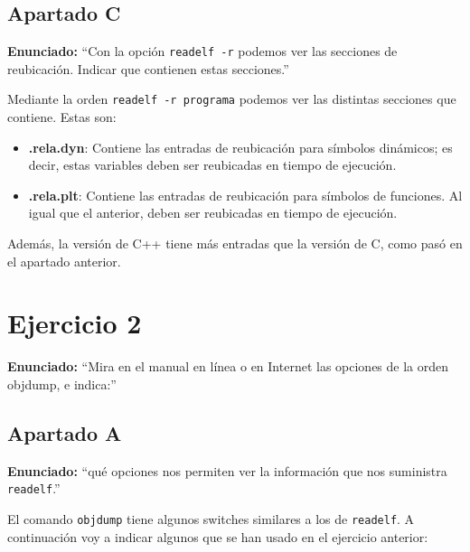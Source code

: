 \documentclass{article}
\begin{document}
\newpage

\subsection{Apartado C}

\textbf{Enunciado: }``Con la opción \texttt{readelf -r} podemos ver las secciones de reubicación. Indicar que contienen estas secciones.''

\bigskip

Mediante la orden \verb|readelf -r programa| podemos ver las distintas secciones que contiene. Estas son:

\begin{itemize}
    \item \textbf{.rela.dyn}: Contiene las entradas de reubicación para símbolos dinámicos; es decir, estas variables deben ser reubicadas en tiempo de ejecución.
    \item \textbf{.rela.plt}: Contiene las entradas de reubicación para símbolos de funciones. Al igual que el anterior, deben ser reubicadas en tiempo de ejecución.
\end{itemize}

Además, la versión de C++ tiene más entradas que la versión de C, como pasó en el apartado anterior.

\bigskip

\section{Ejercicio 2}

\textbf{Enunciado: }``Mira en el manual en línea o en Internet las opciones de la orden objdump, e indica:''

\subsection{Apartado A}

\textbf{Enunciado: }``qué opciones nos permiten ver la información que nos suministra \texttt{readelf}.''

\bigskip

El comando \verb|objdump| tiene algunos switches similares a los de \verb|readelf|. A continuación voy a indicar algunos que se han usado en el ejercicio anterior:
\end{document}
